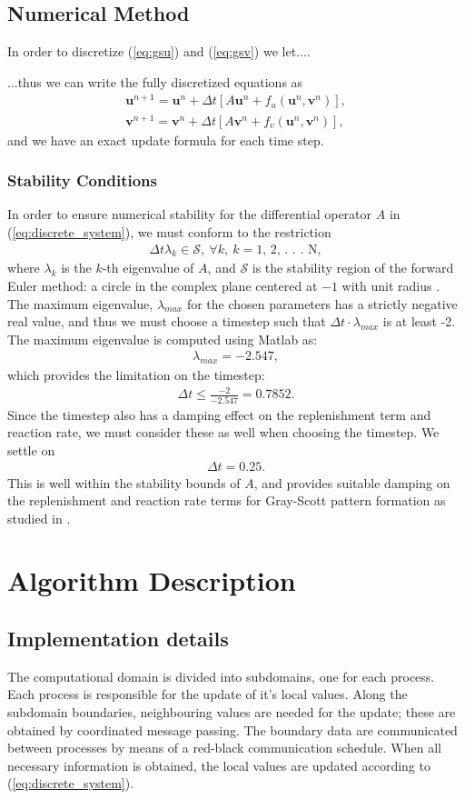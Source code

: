 \documentclass[a4paper,11pt]{article}
\newcommand{\ba}[1]{\begin{align*}    #1    \end{align*}}
\newcommand{\ban}[1]{\begin{align}    #1    \end{align}}
\renewcommand{\vec}[1]{\mathbf{#1}}
\begin{document}
\subsection*{Numerical Method}
In order to discretize (\ref{eq:gsu}) and (\ref{eq:gsv}) we let....

...thus we can write the fully discretized equations as
\ban{
\label{eq:discrete_system}
\vec{u}^{n+1} = \vec{u}^{n} + \Delta t [A \vec{u}^{n} + f_u(\vec{u}^{n},\vec{v}^{n})],\\
\vec{v}^{n+1} = \vec{v}^{n} + \Delta t [A \vec{v}^{n} + f_v(\vec{u}^{n},\vec{v}^{n})],
}
and we have an exact update formula for each time step.

\subsubsection*{Stability Conditions}
In order to ensure numerical stability for the differential operator $A$ in  (\ref{eq:discrete_system}), we must conform to the restriction
\ba{
\Delta t \lambda_k \in \mathcal{S}, \ \forall k, \ k = \text{1, 2, . . . N},
}
where $\lambda_k$ is the $k$-th eigenvalue of $A$, and $\mathcal{S}$ is the stability region of the forward Euler method: a circle in the complex plane centered at $-1$ with unit radius \cite{Edsberg}.  The maximum eigenvalue, $\lambda_{max}$ for the chosen parameters has a strictly negative real value, and thus we must choose a timestep such that $\Delta t \cdot \lambda_{max}$ is at least -2.  The maximum eigenvalue is computed using Matlab as:
\ba{
\lambda_{max} = -2.547,
}
which provides the limitation on the timestep:
\ba{
\Delta t \le \frac{-2}{-2.547} = 0.7852.
}
Since the timestep also has a damping effect on the replenishment term and reaction rate, we must consider these as well when choosing the timestep.  We settle on 
\ba{
\Delta t = 0.25.
}
This is well within the stability bounds of $A$, and provides suitable damping on the replenishment and reaction rate terms for Gray-Scott pattern formation as studied in \cite{Wang}.

\section*{Algorithm Description}
\subsection*{Implementation details}
The computational domain is divided into subdomains, one for each process.  Each process is responsible for the update of it's local values.  Along the subdomain boundaries, neighbouring values are needed for the update; these are obtained by coordinated message passing.  The boundary data are communicated between processes by means of a red-black communication schedule.  When all necessary information is obtained, the local values are updated according to (\ref{eq:discrete_system}).
\end{document}
